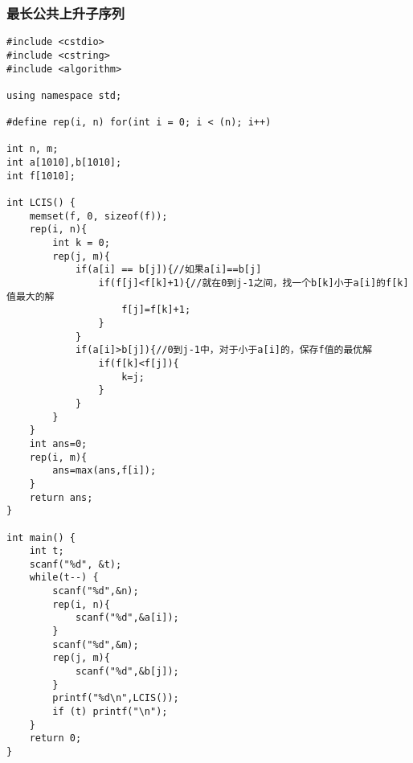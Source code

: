 \subsubsection{最长公共上升子序列}
\begin{verbatim}
#include <cstdio>
#include <cstring>
#include <algorithm>

using namespace std;

#define rep(i, n) for(int i = 0; i < (n); i++)

int n, m;
int a[1010],b[1010];
int f[1010];

int LCIS() {
    memset(f, 0, sizeof(f));
    rep(i, n){
        int k = 0;
        rep(j, m){
            if(a[i] == b[j]){//如果a[i]==b[j] 
                if(f[j]<f[k]+1){//就在0到j-1之间，找一个b[k]小于a[i]的f[k]值最大的解
                    f[j]=f[k]+1;
                }
            }
            if(a[i]>b[j]){//0到j-1中，对于小于a[i]的，保存f值的最优解
                if(f[k]<f[j]){
                    k=j;
                }
            }
        }
    }
    int ans=0;
    rep(i, m){
        ans=max(ans,f[i]);
    }
    return ans;
}

int main() {
    int t;
    scanf("%d", &t);
    while(t--) {
        scanf("%d",&n);
        rep(i, n){
            scanf("%d",&a[i]);
        }
        scanf("%d",&m);
        rep(j, m){
            scanf("%d",&b[j]);
        }
        printf("%d\n",LCIS());
        if (t) printf("\n");
    }
    return 0;
}
\end{verbatim}
